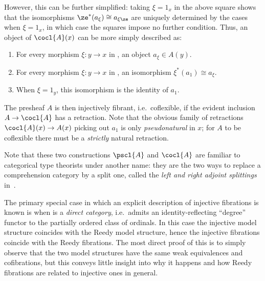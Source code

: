 \begin{verbose}
\begin{eg}
  However, this can be further simplified: taking $\xi=1_x$ in the above square shows that the isomorphisms $\ze^*(a_\xi) \cong a_{\xi\ze}$ are uniquely determined by the cases when $\xi=1_x$, in which case the squares impose no further condition.
  Thus, an object of $\cocl{A}(x)$ can be more simply described as:
  \begin{enumerate}[label=(\arabic*$'$)]
  \item For every morphism $\xi:y\to x$ in \D, an object $a_\xi \in A(y)$.
  \item For every morphism $\xi:y\to x$ in \D, an isomorphism $\xi^*(a_1) \cong a_\xi$.
  \item When $\xi=1_y$, this isomorphism is the identity of $a_1$.
  \end{enumerate}
  The presheaf $A$ is then injectively fibrant, i.e.\ coflexible, if the evident inclusion $A\to \cocl{A}$ has a retraction.
  Note that the obvious family of retractions $\cocl{A}(x) \to A(x)$ picking out $a_{1}$ is only \emph{pseudonatural} in $x$; for $A$ to be coflexible there must be a \emph{strictly} natural retraction.

  Note that these two constructions $\pscl{A}$ and $\cocl{A}$ are familiar to categorical type theorists under another name: they are the two ways to replace a comprehension category by a split one, called the \emph{left and right adjoint splittings} in~\cite{lw:localuniv}.
\end{eg}

\begin{eg}
  The primary special case in which an explicit description of injective fibrations is known is when \D is a \emph{direct category}, i.e.\ admits an identity-reflecting ``degree'' functor to the partially ordered class of ordinals.
  In this case the injective model structure coincides with the Reedy model structure, hence the injective fibrations coincide with the Reedy fibrations.
  The most direct proof of this is to simply observe that the two model structures have the same weak equivalences and cofibrations, but this conveys little insight into why it happens and how Reedy fibrations are related to injective ones in general.


\end{eg}
\end{verbose}
